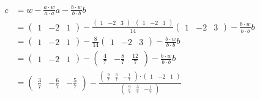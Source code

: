 \documentclass[12pt, fleqn, leqno]{extreport}
\begin{document}
\begin{equation}
    \begin{split}
        c & = w - \frac{a \cdot w}{a \cdot a}a - \frac{b \cdot w}{b \cdot b}b
        \\ &=
        \begin{pmatrix}
            1 & -2 & 1
        \end{pmatrix}
        - \frac{
            \begin{pmatrix}
                1 & -2 & 3
            \end{pmatrix}
            \cdot
            \begin{pmatrix}
                1 & -2 & 1
            \end{pmatrix}
        }{14}
        \begin{pmatrix}
            1 & -2 & 3
        \end{pmatrix}
        - \frac{b \cdot w}{b \cdot b}b
        \\ &=
        \begin{pmatrix}
            1 & -2 & 1
        \end{pmatrix}
        - \frac{8}{14}
        \begin{pmatrix}
            1 & -2 & 3
        \end{pmatrix}
        - \frac{b \cdot w}{b \cdot b}b
        \\ &=
        \begin{pmatrix}
            1 & -2 & 1
        \end{pmatrix}
        -
        \begin{pmatrix}
            \frac{4}{7} & -\frac{8}{7} & \frac{12}{7}
        \end{pmatrix}
        - \frac{b \cdot w}{b \cdot b}b
        \\ &=
        \begin{pmatrix}
            \frac{3}{7} & -\frac{6}{7} & -\frac{5}{7}
        \end{pmatrix}
        - \frac{
            \begin{pmatrix}
                \frac{9}{7} & \frac{3}{7} & -\frac{1}{7}
            \end{pmatrix}
            \cdot
            \begin{pmatrix}
                1 & -2 & 1
            \end{pmatrix}
        }{
            \begin{pmatrix}
                \frac{9}{7} & \frac{3}{7} & -\frac{1}{7}
            \end{pmatrix}
}
\end{split}
\end{equation}
\end{document}
